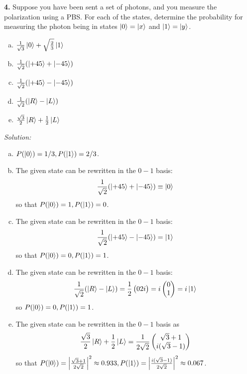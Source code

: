 \documentclass{book}
\theoremstyle{definition}
\newcommand{\f}[2]{\frac{#1}{#2}}
\begin{document}
\newpage



\noindent \textbf{4.} Suppose you have been sent a set of photons, and you measure the polarization using a PBS. For each of the states, determine the probability for measuring the photon being in states $\ket{0} = \ket{x}$ and $\ket{1} = \ket{y}$. 
\begin{enumerate}[(a)]
	\item $\f{1}{\sqrt{3}}\ket{0} + \sqrt{\f{2}{3}}\ket{1}$
	\item $\f{1}{\sqrt{2}}(\ket{+45} + \ket{-45} ) $
	\item $\f{1}{\sqrt{2}}(\ket{+45} - \ket{-45}) $
	\item $\f{1}{\sqrt{2}}(\ket{R} - \ket{L})$
	\item $\f{\sqrt{3}}{2}\ket{R} + \f{1}{2}\ket{L}$
\end{enumerate}


\noindent \textit{Solution:} 
\begin{enumerate}[(a)]
	\item $P(\ket{0}) = 1/3, P(\ket{1}) = {2/3}$.
	\item The given state can be rewritten in the $0-1$ basis:
	\begin{align}
	\f{1}{\sqrt{2}}(\ket{+45} + \ket{-45} ) \equiv \ket{0}
	\end{align}
	so that $P(\ket{0}) = 1, P(\ket{1}) = 0$.
	\item The given state can be rewritten in the $0-1$ basis:
	\begin{align}
	\f{1}{\sqrt{2}}(\ket{+45} - \ket{-45}) = \ket{1}
	\end{align}
	so that $P(\ket{0}) = 0, P(\ket{1}) = 1$.
	\item The given state can be rewritten in the $0-1$ basis:
	\begin{align}
	\f{1}{\sqrt{2}}(\ket{R} - \ket{L}) = \f{1}{2}\begin{pmatrix}
	0 2i
	\end{pmatrix} = i\begin{pmatrix}
	0\\1
	\end{pmatrix} = i\ket{1}
	\end{align}
	so $P(\ket{0}) = 0, P(\ket{1}) = 1$.
	\item The given state can be rewritten in the $0-1$ basis as
	\begin{align}
	\f{\sqrt{3}}{2}\ket{R} + \f{1}{2}\ket{L} = \f{1}{2\sqrt{2}}\begin{pmatrix}
	\sqrt{3}+1 \\ i(\sqrt{3}-1)
	\end{pmatrix}
	\end{align}
	so that $P(\ket{0}) = \abs{\f{\sqrt{3}+1}{2\sqrt{2}}}^2 \approx 0.933, P(\ket{1}) = \abs{\f{i(\sqrt{3}-1)}{2\sqrt{2}}}^2 \approx 0.067$.
\end{enumerate}
\end{document}
